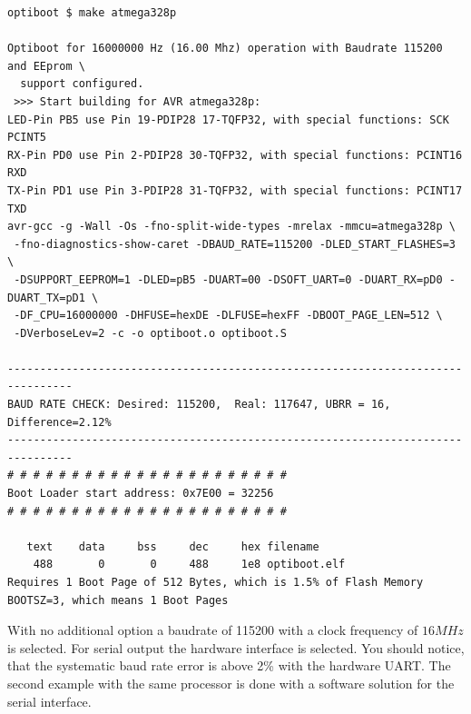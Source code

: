 \begin{verbatim}
optiboot $ make atmega328p

Optiboot for 16000000 Hz (16.00 Mhz) operation with Baudrate 115200 and EEprom \
  support configured.
 >>> Start building for AVR atmega328p:
LED-Pin PB5 use Pin 19-PDIP28 17-TQFP32, with special functions: SCK PCINT5
RX-Pin PD0 use Pin 2-PDIP28 30-TQFP32, with special functions: PCINT16 RXD
TX-Pin PD1 use Pin 3-PDIP28 31-TQFP32, with special functions: PCINT17 TXD
avr-gcc -g -Wall -Os -fno-split-wide-types -mrelax -mmcu=atmega328p \
 -fno-diagnostics-show-caret -DBAUD_RATE=115200 -DLED_START_FLASHES=3 \
 -DSUPPORT_EEPROM=1 -DLED=pB5 -DUART=00 -DSOFT_UART=0 -DUART_RX=pD0 -DUART_TX=pD1 \
 -DF_CPU=16000000 -DHFUSE=hexDE -DLFUSE=hexFF -DBOOT_PAGE_LEN=512 \
 -DVerboseLev=2 -c -o optiboot.o optiboot.S

--------------------------------------------------------------------------------
BAUD RATE CHECK: Desired: 115200,  Real: 117647, UBRR = 16, Difference=2.12%
--------------------------------------------------------------------------------
# # # # # # # # # # # # # # # # # # # # # #
Boot Loader start address: 0x7E00 = 32256
# # # # # # # # # # # # # # # # # # # # # #

   text    data     bss     dec     hex filename
    488       0       0     488     1e8 optiboot.elf
Requires 1 Boot Page of 512 Bytes, which is 1.5% of Flash Memory
BOOTSZ=3, which means 1 Boot Pages

\end{verbatim}


With no additional option a baudrate of 115200 with a clock frequency of \(16 MHz\) is selected.
For serial output the hardware interface is selected.
You should notice, that the systematic baud rate error is above 2\% with the hardware UART.
The second example with the same processor is done with a software solution for the serial interface.

